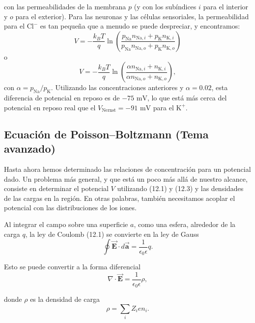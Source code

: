 \documentclass[12pt]{book}
\begin{document}
con las permeabilidades de la membrana $p$ (y con los subíndices $i$ para el interior y $o$ para el exterior). Para las neuronas y las células sensoriales, la permeabilidad para el $\text{Cl}^-$ es tan pequeña que a menudo se puede despreciar, y encontramos:
\begin{equation}
V = -\frac{k_B T}{q} \ln\left( \frac{p_{\text{Na}} n_{\text{Na},i} + p_{\text{K}} n_{\text{K},i}}{p_{\text{Na}} n_{\text{Na},o} + p_{\text{K}} n_{\text{K},o}} \right) \label{eq:12.33}
\end{equation}
o
\begin{equation}
V = -\frac{k_B T}{q} \ln\left( \frac{\alpha n_{\text{Na},i} + n_{\text{K},i}}{\alpha n_{\text{Na},o} + n_{\text{K},o}} \right), \label{eq:12.34}
\end{equation}
con $\alpha = p_{\text{Na}}/p_{\text{K}}$. Utilizando las concentraciones anteriores y $\alpha = 0.02$, esta diferencia de potencial en reposo es de $-75\text{ mV}$, lo que está más cerca del potencial en reposo real que el $V_{\text{Nernst}} = -91\text{ mV}$ para el $\text{K}^+$.

\subsection{Ecuación de Poisson--Boltzmann (Tema avanzado)}
\label{subsec:poisson_boltzmann}

Hasta ahora hemos determinado las relaciones de concentración para un potencial dado. Un problema más general, y que está un poco más allá de nuestro alcance, consiste en determinar el potencial $V$ utilizando (12.1) y (12.3) y las densidades de las cargas en la región. En otras palabras, también necesitamos acoplar el potencial con las distribuciones de los iones.

Al integrar el campo sobre una superficie $a$, como una esfera, alrededor de la carga $q$, la ley de Coulomb (12.1) se convierte en la ley de Gauss
\begin{equation}
\oint \vec{\mathbf{E}} \cdot d\vec{\mathbf{a}} = \frac{1}{\epsilon_0 \epsilon} q. \label{eq:12.35}
\end{equation}

Esto se puede convertir a la forma diferencial
\begin{equation}
\nabla \cdot \vec{\mathbf{E}} = \frac{1}{\epsilon_0 \epsilon} \rho, \label{eq:12.36}
\end{equation}

donde $\rho$ es la densidad de carga
\begin{equation}
\rho = \sum_i Z_i e n_i. \label{eq:12.37}
\end{equation}
\end{document}
